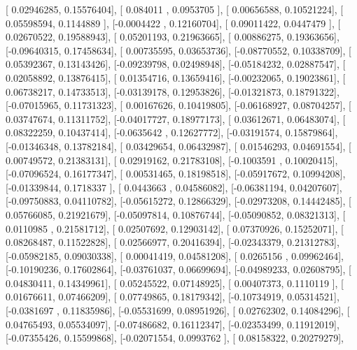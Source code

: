\documentclass{article}
\begin{document}
       [ 0.02946285,  0.15576404],
       [ 0.084011  ,  0.0953705 ],
       [ 0.00656588,  0.10521224],
       [ 0.05598594,  0.1144889 ],
       [-0.0004422 ,  0.12160704],
       [ 0.09011422,  0.0447479 ],
       [ 0.02670522,  0.19588943],
       [ 0.05201193,  0.21963665],
       [ 0.00886275,  0.19363656],
       [-0.09640315,  0.17458634],
       [ 0.00735595,  0.03653736],
       [-0.08770552,  0.10338709],
       [ 0.05392367,  0.13143426],
       [-0.09239798,  0.02498948],
       [-0.05184232,  0.02887547],
       [ 0.02058892,  0.13876415],
       [ 0.01354716,  0.13659416],
       [-0.00232065,  0.19023861],
       [ 0.06738217,  0.14733513],
       [-0.03139178,  0.12953826],
       [-0.01321873,  0.18791322],
       [-0.07015965,  0.11731323],
       [ 0.00167626,  0.10419805],
       [-0.06168927,  0.08704257],
       [ 0.03747674,  0.11311752],
       [-0.04017727,  0.18977173],
       [ 0.03612671,  0.06483074],
       [ 0.08322259,  0.10437414],
       [-0.0635642 ,  0.12627772],
       [-0.03191574,  0.15879864],
       [-0.01346348,  0.13782184],
       [ 0.03429654,  0.06432987],
       [ 0.01546293,  0.04691554],
       [ 0.00749572,  0.21383131],
       [ 0.02919162,  0.21783108],
       [-0.1003591 ,  0.10020415],
       [-0.07096524,  0.16177347],
       [ 0.00531465,  0.18198518],
       [-0.05917672,  0.10994208],
       [-0.01339844,  0.1718337 ],
       [ 0.0443663 ,  0.04586082],
       [-0.06381194,  0.04207607],
       [-0.09750883,  0.04110782],
       [-0.05615272,  0.12866329],
       [-0.02973208,  0.14442485],
       [ 0.05766085,  0.21921679],
       [-0.05097814,  0.10876744],
       [-0.05090852,  0.08321313],
       [ 0.0110985 ,  0.21581712],
       [ 0.02507692,  0.12903142],
       [ 0.07370926,  0.15252071],
       [ 0.08268487,  0.11522828],
       [ 0.02566977,  0.20416394],
       [-0.02343379,  0.21312783],
       [-0.05982185,  0.09030338],
       [ 0.00041419,  0.04581208],
       [ 0.0265156 ,  0.09962464],
       [-0.10190236,  0.17602864],
       [-0.03761037,  0.06699694],
       [-0.04989233,  0.02608795],
       [ 0.04830411,  0.14349961],
       [ 0.05245522,  0.07148925],
       [ 0.00407373,  0.1110119 ],
       [ 0.01676611,  0.07466209],
       [ 0.07749865,  0.18179342],
       [-0.10734919,  0.05314521],
       [-0.0381697 ,  0.11835986],
       [-0.05531699,  0.08951926],
       [ 0.02762302,  0.14084296],
       [ 0.04765493,  0.05534097],
       [-0.07486682,  0.16112347],
       [-0.02353499,  0.11912019],
       [-0.07355426,  0.15599868],
       [-0.02071554,  0.0993762 ],
       [ 0.08158322,  0.20279279],
\end{document}
